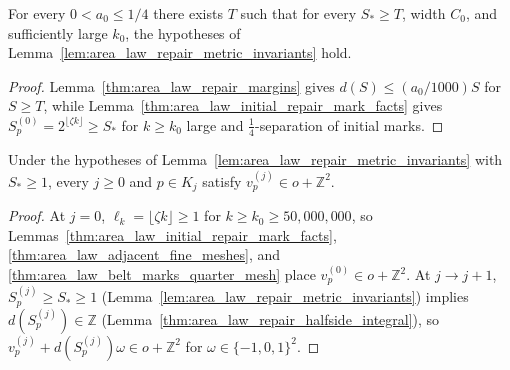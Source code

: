 \begin{lemma}
    \label{lem:area_law_repair_metric_choice}
    \leanok
    For every $0<a_0\le1/4$ there exists $T$ such that for every $S_*\ge T$, width $C_0$, and
    sufficiently large $k_0$, the hypotheses of Lemma~\ref{lem:area_law_repair_metric_invariants} hold.
\end{lemma}

\begin{proof}
    \leanok
    Lemma~\ref{thm:area_law_repair_margins} gives $d(S)\le(a_0/1000)S$ for $S\ge T$, while
    Lemma~\ref{thm:area_law_initial_repair_mark_facts} gives $S_p^{(0)}=2^{\lfloor\zeta k\rfloor}\ge S_*$
    for $k\ge k_0$ large and $\frac14$-separation of initial marks.
\end{proof}

\begin{lemma}
    \label{thm:area_law_repair_marks_integer_mesh}
    \leanok
    Under the hypotheses of Lemma~\ref{lem:area_law_repair_metric_invariants} with $S_*\ge1$,
    every $j\ge0$ and $p\in K_j$ satisfy $v_p^{(j)}\in o+\mathbb Z^2$.
\end{lemma}

\begin{proof}
    \leanok
    At $j=0$, $\ell_k=\lfloor\zeta k\rfloor\ge1$ for $k\ge k_0\ge50{,}000{,}000$, so
    Lemmas~\ref{thm:area_law_initial_repair_mark_facts}, \ref{thm:area_law_adjacent_fine_meshes},
    and \ref{thm:area_law_belt_marks_quarter_mesh} place $v_p^{(0)}\in o+\mathbb Z^2$.
    At $j\to j+1$, $S_p^{(j)}\ge S_*\ge1$ (Lemma~\ref{lem:area_law_repair_metric_invariants}) implies
    $d(S_p^{(j)})\in\mathbb Z$ (Lemma~\ref{thm:area_law_repair_halfside_integral}), so
    $v_p^{(j)}+d(S_p^{(j)})\omega\in o+\mathbb Z^2$ for $\omega\in\{-1,0,1\}^2$.
\end{proof}

